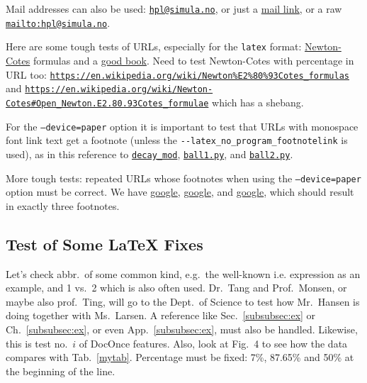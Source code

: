 \n\documentclass[%
oneside,                 %
final,                   %
10pt]{article}
\theoremstyle{definition}
\begin{document}
\begin{enumerate}
Mail addresses can also be used: \href{{mailto:hpl@simula.no}}{\nolinkurl{hpl@simula.no}}, or just a \href{{mailto:hpl@simula.no}}{mail link}, or a raw \href{{mailto:hpl@simula.no}}{\nolinkurl{mailto:hpl@simula.no}}.

Here are some tough tests of URLs, especially for the \texttt{latex} format:
\href{{https://en.wikipedia.org/wiki/Newton%E2%80%93Cotes_formulas}}{Newton-Cotes} formulas
and a \href{{https://www.springer.com/mathematics/computational+science+%26+engineering/book/978-3-642-23098-1}}{good book}. Need to test
Newton-Cotes with percentage in URL too:
\href{{https://en.wikipedia.org/wiki/Newton%E2%80%93Cotes_formulas}}{\nolinkurl{https://en.wikipedia.org/wiki/Newton\%E2\%80\%93Cotes_formulas}}
and \href{{https://en.wikipedia.org/wiki/Newton-Cotes#Open_Newton.E2.80.93Cotes_formulae}}{\nolinkurl{https://en.wikipedia.org/wiki/Newton-Cotes\#Open_Newton.E2.80.93Cotes_formulae}} which has a shebang.

For the \texttt{--device=paper} option it is important to test that URLs with
monospace font link text get a footnote
(unless the \Verb!--latex_no_program_footnotelink!
is used), as in this reference to
\href{{https://github.com/hplgit/INF5620/tree/gh-pages/src/decay/experiments/decay_mod.py}}{\nolinkurl{decay_mod}}, \href{{https://tinyurl.com/pwyasaa/formulas.ball1.py}}{\nolinkurl{ball1.py}},
and \href{{https://tinyurl.com/pwyasaa/formulas.ball2.py}}{\nolinkurl{ball2.py}}.



More tough tests: repeated URLs whose footnotes when using the
\texttt{--device=paper} option must be correct. We have
\href{{https://google.com}}{google}, \href{{https://google.com}}{google}, and
\href{{https://google.com}}{google}, which should result in exactly three
footnotes.

\subsection{Test of Some {\LaTeX} Fixes}

Let's check abbr.~of some common kind, e.g.~the well-known i.e.
expression as an example, and 1 vs.~2 which is also often used.
Dr.~Tang and Prof.~Monsen, or maybe also prof.~Ting,
will go to the Dept.~of Science to test how Mr.~Hansen is doing together
with Ms.~Larsen. A reference like Sec.~\vref{subsubsec:ex} or
Ch.~\vref{subsubsec:ex}, or even App.~\vref{subsubsec:ex}, must also be
handled. Likewise, this is test no.~$i$ of DocOnce features.
Also, look at Fig.~4 to see how the data compares with Tab.~\vref{mytab}.
Percentage must be fixed: 7\%,  87.65\% and
50\% at the beginning of the line.


\end{enumerate}
\end{document}

